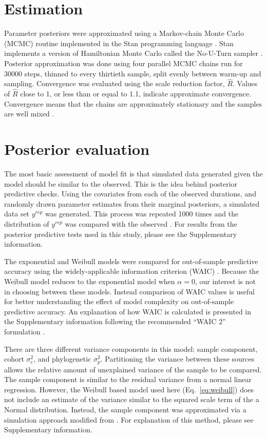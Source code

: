 \documentclass{pnastwo}
\begin{document}
\begin{article}
\begin{materials}
\section{Estimation}
Parameter posteriors were approximated using a Markov-chain Monte Carlo (MCMC) routine implemented in the Stan programming language \cite{2014stan}. Stan implements a version of Hamiltonian Monte Carlo called the No-U-Turn sampler \cite{Hoffman-Gelman:2011}. Posterior approximation was done using four parallel MCMC chains run for 30000 steps, thinned to every thirtieth sample, split evenly between warm-up and sampling. Convergence was evaluated using the scale reduction factor, \(\hat{R}\). Values of \(\hat{R}\) close to 1, or less than or equal to 1.1, indicate approximate convergence. Convergence means that the chains are approximately stationary and the samples are well mixed \cite{Gelman2013d}.


\section{Posterior evaluation}
The most basic assessment of model fit is that simulated data generated given the model should be similar to the observed. This is the idea behind posterior predictive checks. Using the covariates from each of the observed durations, and randomly drawn parameter estimates from their marginal posteriors, a simulated data set \(y^{rep}\) was generated. This process was repeated 1000 times and the distribution of \(y^{rep}\) was compared with the observed \cite{Gelman2013d}. For results from the posterior predictive tests used in this study, please see the Supplementary information.

The exponential and Weibull models were compared for out-of-sample predictive accuracy using the widely-applicable information criterion (WAIC) \cite{Watanabe2010a}. Because the Weibull model reduces to the exponential model when \(\alpha = 0\), our interest is not in choosing between these models. Instead comparison of WAIC values is useful for better understanding the effect of model complexity on out-of-sample predictive accuracy. An explanation of how WAIC is calculated is presented in the Supplementary information following the recommended ``WAIC 2'' formulation \cite{Gelman2013d}.

There are three different variance components in this model: sample component, cohort \(\sigma_{c}^{2}\), and phylogenetic \(\sigma_{p}^{2}\). Partitioning the variance between these sources allows the relative amount of unexplained variance of the sample to be compared. The sample component is similar to the residual variance from a normal linear regression. However, the Weibull based model used here (Eq.~\ref{eq:weibull}) does not include an estimate of the variance similar to the squared scale term of the a Normal distribution. Instead, the sample component was approximated via a simulation approach modified from \cite{Goldstein2002}. For explanation of this method, please see Supplementary information.


\end{materials}
\end{article}
\end{document}
